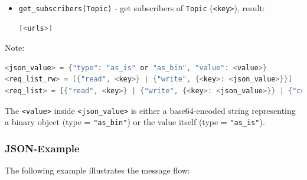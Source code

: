 \documentclass[a4paper]{scrreprt}
\newcommand{\code}[1]{\lstinline[basicstyle=\ttfamily]!#1!}
\begin{document}
\begin{itemize}
\begin{lstlisting}[language=java]
{"status": "ok"} or
{"status": "fail", "reason": "timeout" or "abort" or "not_found"}
\end{lstlisting}
  \item \code{get_subscribers(Topic)} - get subscribers of \code{Topic} (\code{<key>}), result:
\begin{lstlisting}[language=java]
[<urls>]
\end{lstlisting}
\end{itemize}

Note:
\begin{lstlisting}[language=java]
<json_value> = {"type": "as_is" or "as_bin", "value": <value>}
<req_list_rw> = [{"read", <key>} | {"write", {<key>: <json_value>}}]
<req_list> = [{"read", <key>} | {"write", {<key>: <json_value>}} | {"commit", _}]
\end{lstlisting}
The \code{<value>} inside \code{<json_value>} is either a base64-encoded
string representing a binary object (type = \code{"as_bin"}) or the value
itself (type = \code{"as_is"}).

\subsubsection{JSON-Example}

The following example illustrates the message flow:
\end{document}
